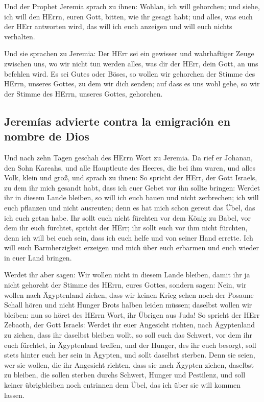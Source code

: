  Und der Prophet Jeremia sprach zu ihnen: Wohlan, ich will
gehorchen; und siehe, ich will den HErrn, euren Gott, bitten, wie ihr
gesagt habt; und alles, was euch der HErr antworten wird, das will ich
euch anzeigen und will euch nichts verhalten.

 Und sie sprachen zu Jeremia: Der HErr sei ein gewisser
und wahrhaftiger Zeuge zwischen uns, wo wir nicht tun werden alles, was
dir der HErr, dein Gott, an uns befehlen wird.  Es sei
Gutes oder Böses, so wollen wir gehorchen der Stimme des HErrn, unseres
Gottes, zu dem wir dich senden; auf dass es uns wohl gehe, so wir der
Stimme des HErrn, unseres Gottes, gehorchen.

\hypertarget{jeremuxedas-advierte-contra-la-emigraciuxf3n-en-nombre-de-dios}{%
\subsection{Jeremías advierte contra la emigración en nombre de
Dios}\label{jeremuxedas-advierte-contra-la-emigraciuxf3n-en-nombre-de-dios}}

 Und nach zehn Tagen geschah des HErrn Wort zu Jeremia.
 Da rief er Johanan, den Sohn Kareahs, und alle Hauptleute
des Heeres, die bei ihm waren, und alles Volk, klein und groß,
 und sprach zu ihnen: So spricht der HErr, der Gott
Israels, zu dem ihr mich gesandt habt, dass ich euer Gebet vor ihn
sollte bringen:  Werdet ihr in diesem Lande bleiben, so
will ich euch bauen und nicht zerbrechen; ich will euch pflanzen und
nicht ausreuten; denn es hat mich schon gereut das Übel, das ich euch
getan habe.  Ihr sollt euch nicht fürchten vor dem König
zu Babel, vor dem ihr euch fürchtet, spricht der HErr; ihr sollt euch
vor ihm nicht fürchten, denn ich will bei euch sein, dass ich euch helfe
und von seiner Hand errette.  Ich will euch
Barmherzigkeit erzeigen und mich über euch erbarmen und euch wieder in
euer Land bringen.

 Werdet ihr aber sagen: Wir wollen nicht in diesem Lande
bleiben, damit ihr ja nicht gehorcht der Stimme des HErrn, eures Gottes,
 sondern sagen: Nein, wir wollen nach Ägyptenland ziehen,
dass wir keinen Krieg sehen noch der Posaune Schall hören und nicht
Hunger Brots halben leiden müssen; daselbst wollen wir bleiben:
 nun so höret des HErrn Wort, ihr Übrigen aus Juda! So
spricht der HErr Zebaoth, der Gott Israels: Werdet ihr euer Angesicht
richten, nach Ägyptenland zu ziehen, dass ihr daselbst bleiben wollt,
 so soll euch das Schwert, vor dem ihr euch fürchtet, in
Ägyptenland treffen, und der Hunger, des ihr euch besorgt, soll stets
hinter euch her sein in Ägypten, und sollt daselbst sterben.
 Denn sie seien, wer sie wollen, die ihr Angesicht
richten, dass sie nach Ägypten ziehen, daselbst zu bleiben, die sollen
sterben durchs Schwert, Hunger und Pestilenz, und soll keiner
übrigbleiben noch entrinnen dem Übel, das ich über sie will kommen
lassen.

